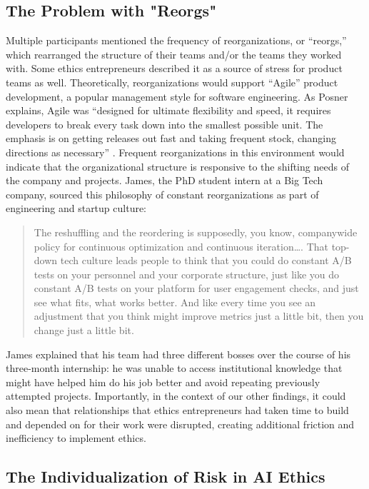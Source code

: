 \documentclass[sigconf]{acmart}
\begin{document}
\subsection{The Problem with "Reorgs"}

Multiple participants mentioned the frequency of reorganizations, or “reorgs,” which rearranged the structure of their teams and/or the teams they worked with. Some ethics entrepreneurs described it as a source of stress for product teams as well. Theoretically, reorganizations would support “Agile” product development, a popular management style for software engineering. As Posner explains, Agile was “designed for ultimate flexibility and speed, it requires developers to break every task down into the smallest possible unit. The emphasis is on getting releases out fast and taking frequent stock, changing directions as necessary” \cite{posner_agile_2022}.  Frequent reorganizations in this environment would indicate that the organizational structure is responsive to the shifting needs of the company and projects. James, the PhD student intern at a Big Tech company, sourced this philosophy of constant reorganizations as part of engineering and startup culture:

\begin{quote}
    The reshuffling and the reordering is supposedly, you know, companywide policy for continuous optimization and continuous iteration…. That top-down tech culture leads people to think that you could do constant A/B tests on your personnel and your corporate structure, just like you do constant A/B tests on your platform for user engagement checks, and just see what fits, what works better. And like every time you see an adjustment that you think might improve metrics just a little bit, then you change just a little bit.

\end{quote}

James explained that his team had three different bosses over the course of his three-month internship: he was unable to access institutional knowledge that might have helped him do his job better and avoid repeating previously attempted projects. Importantly, in the context of our other findings, it could also mean that relationships that ethics entrepreneurs had taken time to build and depended on for their work were disrupted, creating additional friction and inefficiency to implement ethics.


\subsection{The Individualization of Risk in AI Ethics}
\end{document}
